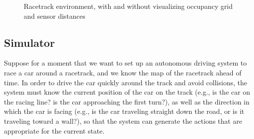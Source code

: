 \documentclass[a4paper]{article}
\begin{document}
\begin{figure}[t!]%
    \centering
    \qquad
    \caption{Racetrack environment, with and without visualizing occupancy grid and sensor distances}%
    \label{fig:example}%
\end{figure}

\subsection*{Simulator}

Suppose for a moment that we want to set up an autonomous driving system to race a car around a racetrack, and we know the map of the racetrack ahead of time. In order to drive the car quickly around the track and avoid collisions, the system must know the current position of the car on the track (e.g., is the car on the racing line? is the car approaching the first turn?), as well as the direction in which the car is facing (e.g., is the car traveling straight down the road, or is it traveling toward a wall?), so that the system can generate the actions that are appropriate for the current state.
\end{document}
